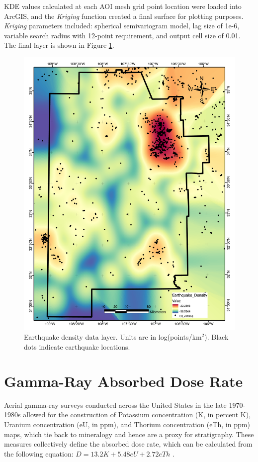 KDE values calculated at each AOI mesh grid point location were loaded into ArcGIS, and the \textit{Kriging} function created a final surface for plotting purposes. \textit{Kriging} parameters included: spherical semivariogram model, lag size of 1e-6, variable search radius with 12-point requirement, and output cell size of 0.01. The final layer is shown in Figure \ref{fig:feat_EQ_density}.
\vfill
\pagebreak

\begin{figure}[H]
\centering
\includegraphics[width=0.75\linewidth]{templates/images/Figure-EarthquakeDensity.pdf}
\caption[Earthquake density data layer]{Earthquake density data layer. Units are in log(points/km$^2$). Black dots indicate earthquake locations.}
\label{fig:feat_EQ_density}
\end{figure}
\pagebreak

\section{Gamma-Ray Absorbed Dose Rate}\label{app:dl_gamma_dose}
Aerial gamma-ray surveys conducted across the United States in the late 1970-1980s allowed for the construction of Potassium concentration (K, in percent K), Uranium concentration (eU, in ppm), and Thorium concentration (eTh, in ppm) maps, which tie back to mineralogy and hence are a proxy for stratigraphy. These measures collectively define the absorbed dose rate, which can be calculated from the following equation: $D = 13.2 K + 5.48 eU + 2.72 eTh$ \citep{duval_terrestrial_2005}.

